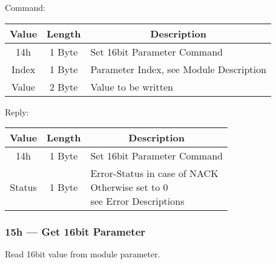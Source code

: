 Command:
\begin{table}[H]
    \centering
    \begin{tabular}{|c|c|l|}
        \hline
        \textbf{Value}   &   \textbf{Length} & \multicolumn{1}{|c|}{\textbf{Description}}\\ \hline \hline
        14h   &  1 Byte & Set 16bit Parameter Command \\ \hline
        Index & 1 Byte  & Parameter Index, see Module Description \\ \hline
        Value & 2 Byte & Value to be written\\ \hline
    \end{tabular}
\label{tab:CAN-14-C}
\end{table}
Reply:
\begin{table}[H]
    \centering
    \begin{tabular}{|c|c|l|}
        \hline
        \textbf{Value}   &   \textbf{Length} & \multicolumn{1}{|c|}{\textbf{Description}}\\ \hline \hline
        14h   &  1 Byte & Set 16bit Parameter Command \\ \hline
        Status & 1 Byte & \makecell[l]{Error-Status in case of NACK \\ Otherwise set to 0\\see Error Descriptions}\\ \hline
    \end{tabular}
\label{tab:CAN-14-R}
\end{table}
\subsubsection{15h --- Get 16bit Parameter}
Read 16bit value from module parameter.

